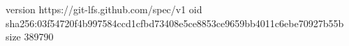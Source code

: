 version https://git-lfs.github.com/spec/v1
oid sha256:03f54720f4b997584ccd1cfbd73408e5ce8853ce9659bb4011c6ebe70927b55b
size 389790
